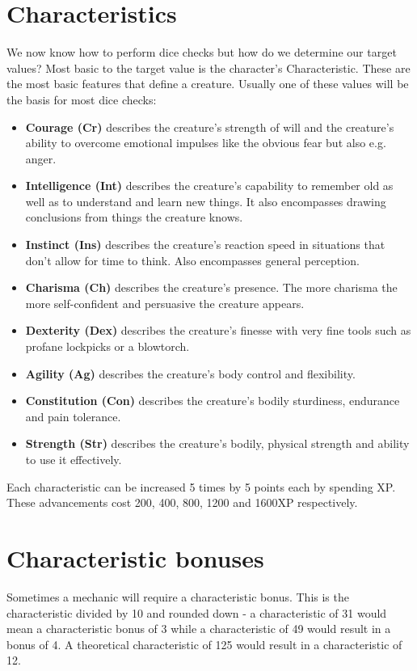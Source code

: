 \documentclass[12pt,a4paper]{book}
\begin{document}
	\section{Characteristics}
	We now know how to perform dice checks but how do we determine our target values? Most basic to the target value is the character’s Characteristic. These are the most basic features that define a creature. Usually one of these values will be the basis for most dice checks:
	\begin{itemize}
		\setlength\itemsep{-8mm}
		\item \textbf{Courage (Cr)} describes the creature’s strength of will and the creature’s ability to overcome emotional impulses like the obvious fear but also e.g. anger.
		\item \textbf{Intelligence (Int)} describes the creature’s capability to remember old as well as to understand and learn new things. It also encompasses drawing conclusions from things the creature knows.
		\item \textbf{Instinct (Ins)} describes the creature’s reaction speed in situations that don’t allow for time to think. Also encompasses general perception.
		\item \textbf{Charisma (Ch)} describes the creature’s presence. The more charisma the more self-confident and persuasive the creature appears.
		\item \textbf{Dexterity (Dex)} describes the creature’s finesse with very fine tools such as profane lockpicks or a blowtorch.
		\item \textbf{Agility (Ag)} describes the creature’s body control and flexibility. 
		\item \textbf{Constitution (Con)} describes the creature’s bodily sturdiness, endurance and pain tolerance.
		\item \textbf{Strength (Str)} describes the creature’s bodily, physical strength and ability to use it effectively.
	\end{itemize}
	Each characteristic can be increased 5 times by 5 points each by spending XP. These advancements cost 200, 400, 800, 1200 and 1600XP respectively.
	\section{Characteristic bonuses}
	Sometimes a mechanic will require a characteristic bonus. This is the characteristic divided by 10 and rounded down - a characteristic of 31 would mean a characteristic bonus of 3 while a characteristic of 49 would result in a bonus of 4. A theoretical characteristic of 125 would result in a characteristic of 12.
\end{document}
